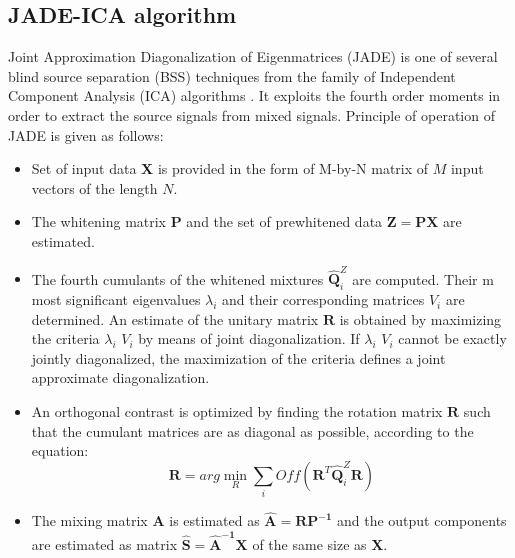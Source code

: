\subsection{JADE-ICA algorithm}
Joint Approximation Diagonalization of Eigenmatrices (JADE) is one of several blind source separation (BSS) techniques from the family of Independent Component Analysis (ICA) algorithms \cite{Cardoso1999,Cardoso1996,Comon,Krishnaveni2005}. It exploits the fourth order moments in order to extract the source signals from mixed signals. Principle of operation of JADE is given as follows:
\begin{itemize}
\renewcommand{\labelitemi}{$\bullet$}
\item Set of input data \textbf{X} is provided in the form of M-by-N matrix of $M$ input vectors of the length $N$.
\item The whitening matrix \textbf{P} and the set of prewhitened data $\bm{Z = PX}$ are estimated.
\item The fourth cumulants of the whitened mixtures $\bm{\hat{Q}}_i^Z$ are computed. Their m most significant eigenvalues $\lambda_{i}$ and their corresponding matrices $V_{i}$ are determined. An estimate of the unitary matrix $\bm{R}$ is obtained by maximizing the criteria $\lambda_{i}$ $V_{i}$ by means of joint diagonalization. If $\lambda_{i}$ $V_{i}$ cannot be exactly jointly diagonalized, the maximization of the criteria defines a joint approximate diagonalization.
\item An orthogonal contrast is optimized by finding the rotation matrix $\bm{R}$ such that the cumulant matrices are as diagonal as possible, according to the equation:
$$
\mathbf{R}=arg\min_{R}\sum_{i}Off\left(\mathbf{R}^{T}\mathbf{\hat{Q}}_i^Z\mathbf{R}\right)
$$
\item The mixing matrix $\bm{A}$ is estimated as $\bm{\hat{A}=RP^{-1}}$ and the output components are estimated as matrix $\bm{\hat{S}=\hat{A}^{-1} X}$ of the same size as \textbf{X}.
\end{itemize}
